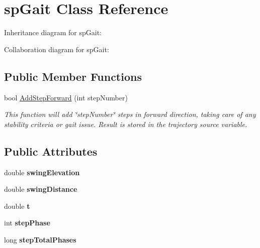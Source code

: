 \hypertarget{classspGait}{}\section{sp\+Gait Class Reference}
\label{classspGait}


Inheritance diagram for sp\+Gait\+:


Collaboration diagram for sp\+Gait\+:
\subsection*{Public Member Functions}
\begin{DoxyCompactItemize}
\item 
bool \hyperlink{classspGait_a0053df3db6e9061e986408386b064dd4}{Add\+Step\+Forward} (int step\+Number)
\begin{DoxyCompactList}\small\item\em This function will add \char`\"{}step\+Number\char`\"{} steps in forward direction, taking care of any stability criteria or gait issue. Result is stored in the trajectory source variable. \end{DoxyCompactList}\end{DoxyCompactItemize}
\subsection*{Public Attributes}
\begin{DoxyCompactItemize}
\item 
\hypertarget{classspGait_a144ff064b71e8ed3f8ab487c97795bbc}{}double {\bfseries swing\+Elevation}\label{classspGait_a144ff064b71e8ed3f8ab487c97795bbc}

\item 
\hypertarget{classspGait_adc0c85585717d39c89868f0b0f13def3}{}double {\bfseries swing\+Distance}\label{classspGait_adc0c85585717d39c89868f0b0f13def3}

\item 
\hypertarget{classspGait_ae87571122d9d31ed189a19be29ccb7fa}{}double {\bfseries t}\label{classspGait_ae87571122d9d31ed189a19be29ccb7fa}

\item 
\hypertarget{classspGait_a52ea02e69dc2c2791d169dc8974c8c8b}{}int {\bfseries step\+Phase}\label{classspGait_a52ea02e69dc2c2791d169dc8974c8c8b}

\item 
\hypertarget{classspGait_af278dddbe1fc697b00ae3f1b88cb0a84}{}long {\bfseries step\+Total\+Phases}\label{classspGait_af278dddbe1fc697b00ae3f1b88cb0a84}

\end{DoxyCompactItemize}


